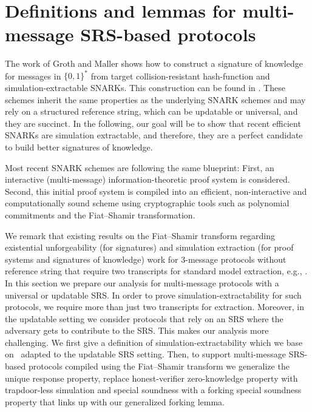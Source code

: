 \section{Definitions and lemmas for multi-message SRS-based protocols}
\label{sec:se_definitions}


  The work of Groth and Maller
\cite{C:GroMal17} shows how to construct a signature of knowledge for messages in
$\{0, 1\}^*$ from target collision-resistant hash-function and simulation-extractable
SNARKs. This construction can be found in .
These schemes inherit the same properties as the underlying SNARK schemes and
may rely on a structured reference string, which can be updatable or universal, and they are
succinct.  In the following, our goal will be to show that recent efficient SNARKs are
simulation extractable, and therefore, they are a perfect candidate to build better
signatures of knowledge.

  Most recent SNARK schemes
are following the same blueprint: First, an interactive (multi-message)
information-theoretic proof system is considered.
Second, this initial proof system is compiled into an efficient, non-interactive and
computationally sound scheme using cryptographic tools such as polynomial commitments
and the Fiat--Shamir transformation.

We remark that existing results on the Fiat--Shamir transform regarding existential
unforgeability (for signatures) and simulation extraction (for proof systems and
signatures of knowledge) work for $3$-message protocols without reference string that
require two transcripts for standard model extraction, e.g.,
\cite{JC:PoiSte00,INDOCRYPT:FKMV12,C:RotSeg21}.  In this section we prepare our
analysis for multi-message protocols with a universal or updatable SRS.  In order to
prove simulation-extractability for such protocols, we require more than just two
transcripts for extraction.  Moreover, in the updatable setting we consider protocols
that rely on an SRS where the adversary gets to contribute to the SRS. This makes our
analysis more challenging.  We first give a definition of simulation-extractability
which we base on~\cite{INDOCRYPT:FKMV12} adapted to the updatable SRS setting. Then,
to support multi-message SRS-based protocols compiled using the Fiat--Shamir transform
we generalize the unique response property, replace honest-verifier zero-knowledge
property with trapdoor-less simulation and special soundness with a forking special
soundness property that links up with our generalized forking lemma.

